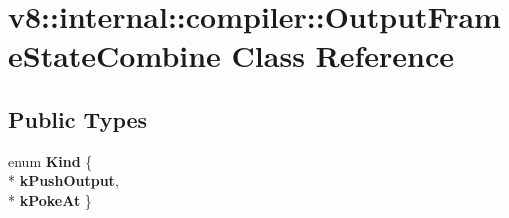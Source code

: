 \hypertarget{classv8_1_1internal_1_1compiler_1_1_output_frame_state_combine}{}\section{v8\+:\+:internal\+:\+:compiler\+:\+:Output\+Frame\+State\+Combine Class Reference}
\label{classv8_1_1internal_1_1compiler_1_1_output_frame_state_combine}
\subsection*{Public Types}
\begin{DoxyCompactItemize}
\item 
enum {\bfseries Kind} \{ \\*
{\bfseries k\+Push\+Output}, 
\\*
{\bfseries k\+Poke\+At}
 \}\hypertarget{classv8_1_1internal_1_1compiler_1_1_output_frame_state_combine_a7ae5cb5a14c001c96000c213dc710b46}{}\label{classv8_1_1internal_1_1compiler_1_1_output_frame_state_combine_a7ae5cb5a14c001c96000c213dc710b46}

\end{DoxyCompactItemize}
